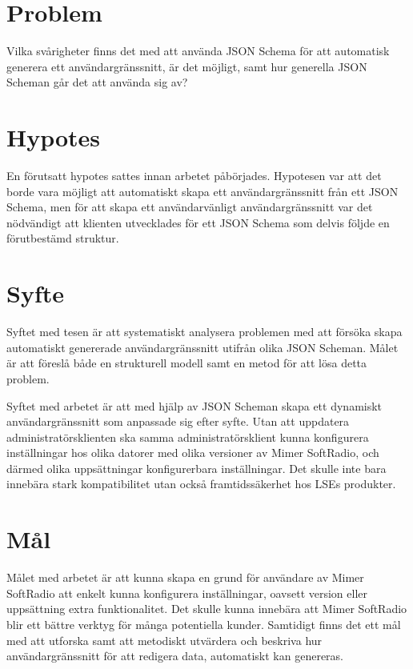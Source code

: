 \section{Problem}
\label{sec:intro:problem}
Vilka svårigheter finns det med att använda JSON Schema för att automatisk generera ett användargränssnitt, är det möjligt, samt hur generella JSON Scheman går det att använda sig av?

\section{Hypotes}
\label{sec:intro:hypotes}
En förutsatt hypotes sattes innan arbetet påbörjades. Hypotesen var att det borde vara möjligt att automatiskt skapa ett användargränssnitt från ett JSON Schema, men för att skapa ett användarvänligt användargränssnitt var det nödvändigt att klienten utvecklades för ett JSON Schema som delvis följde en förutbestämd struktur.

\section{Syfte}
\label{sec:intro:syfte}
Syftet med tesen är att systematiskt analysera problemen med att försöka skapa automatiskt genererade användargränssnitt utifrån olika JSON Scheman. Målet är att föreslå både en strukturell modell samt en metod för att lösa detta problem.

Syftet med arbetet är att med hjälp av JSON Scheman skapa ett dynamiskt användargränssnitt som anpassade sig efter syfte. Utan att uppdatera administratörsklienten ska samma administratörsklient kunna konfigurera inställningar hos olika datorer med olika versioner av Mimer SoftRadio, och därmed olika uppsättningar konfigurerbara inställningar. Det skulle inte bara innebära stark kompatibilitet utan också framtidssäkerhet hos LSEs produkter.

\section{Mål}
\label{sec:intro:mål}
Målet med arbetet är att kunna skapa en grund för användare av Mimer SoftRadio att enkelt kunna konfigurera inställningar, oavsett version eller uppsättning extra funktionalitet. Det skulle kunna innebära att Mimer SoftRadio blir ett bättre verktyg för många potentiella kunder. Samtidigt finns det ett mål med att utforska samt att metodiskt utvärdera och beskriva hur användargränssnitt för att redigera data, automatiskt kan genereras.

